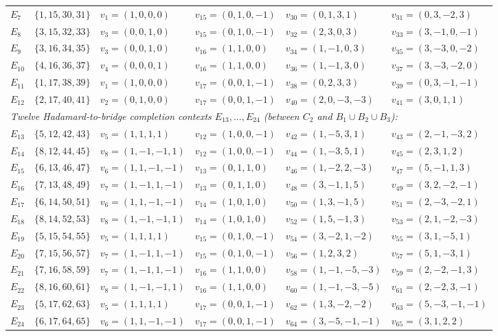 \documentclass[
  aps,
  pra,
  reprint,
  superscriptaddress,
  amsmath,
  amssymb,
  nofootinbib,
  floatfix
]{revtex4-2}
\theoremstyle{definition}
\theoremstyle{remark}
\begin{document}
\begin{table}[t]
\begin{ruledtabular}
\begin{tabular}{llllll}
$E_7$  & $\{1,15,30,31\}$ & $v_1=(1,0,0,0)$ & $v_{15}=(0,1,0,-1)$ & $v_{30}=(0,1,3,1)$   & $v_{31}=(0,3,-2,3)$ \\
$E_8$  & $\{3,15,32,33\}$ & $v_3=(0,0,1,0)$ & $v_{15}=(0,1,0,-1)$ & $v_{32}=(2,3,0,3)$   & $v_{33}=(3,-1,0,-1)$ \\
$E_9$  & $\{3,16,34,35\}$ & $v_3=(0,0,1,0)$ & $v_{16}=(1,1,0,0)$  & $v_{34}=(1,-1,0,3)$  & $v_{35}=(3,-3,0,-2)$ \\
$E_{10}$ & $\{4,16,36,37\}$ & $v_4=(0,0,0,1)$ & $v_{16}=(1,1,0,0)$  & $v_{36}=(1,-1,3,0)$  & $v_{37}=(3,-3,-2,0)$ \\
$E_{11}$ & $\{1,17,38,39\}$ & $v_1=(1,0,0,0)$ & $v_{17}=(0,0,1,-1)$ & $v_{38}=(0,2,3,3)$   & $v_{39}=(0,3,-1,-1)$ \\
$E_{12}$ & $\{2,17,40,41\}$ & $v_2=(0,1,0,0)$ & $v_{17}=(0,0,1,-1)$ & $v_{40}=(2,0,-3,-3)$ & $v_{41}=(3,0,1,1)$ \\ \hline
\multicolumn{6}{l}{\emph{Twelve Hadamard-to-bridge completion contexts $E_{13},\ldots,E_{24}$ (between $C_2$ and $B_1\cup B_2\cup B_3$):}} \\
$E_{13}$ & $\{5,12,42,43\}$ & $v_5=(1,1,1,1)$    & $v_{12}=(1,0,0,-1)$ & $v_{42}=(1,-5,3,1)$   & $v_{43}=(2,-1,-3,2)$ \\
$E_{14}$ & $\{8,12,44,45\}$ & $v_8=(1,-1,-1,1)$  & $v_{12}=(1,0,0,-1)$ & $v_{44}=(1,-3,5,1)$   & $v_{45}=(2,3,1,2)$ \\
$E_{15}$ & $\{6,13,46,47\}$ & $v_6=(1,1,-1,-1)$  & $v_{13}=(0,1,1,0)$  & $v_{46}=(1,-2,2,-3)$  & $v_{47}=(5,-1,1,3)$ \\
$E_{16}$ & $\{7,13,48,49\}$ & $v_7=(1,-1,1,-1)$  & $v_{13}=(0,1,1,0)$  & $v_{48}=(3,-1,1,5)$   & $v_{49}=(3,2,-2,-1)$ \\
$E_{17}$ & $\{6,14,50,51\}$ & $v_6=(1,1,-1,-1)$  & $v_{14}=(1,0,1,0)$  & $v_{50}=(1,3,-1,5)$   & $v_{51}=(2,-3,-2,1)$ \\
$E_{18}$ & $\{8,14,52,53\}$ & $v_8=(1,-1,-1,1)$  & $v_{14}=(1,0,1,0)$  & $v_{52}=(1,5,-1,3)$   & $v_{53}=(2,1,-2,-3)$ \\
$E_{19}$ & $\{5,15,54,55\}$ & $v_5=(1,1,1,1)$    & $v_{15}=(0,1,0,-1)$ & $v_{54}=(3,-2,1,-2)$  & $v_{55}=(3,1,-5,1)$ \\
$E_{20}$ & $\{7,15,56,57\}$ & $v_7=(1,-1,1,-1)$  & $v_{15}=(0,1,0,-1)$ & $v_{56}=(1,2,3,2)$    & $v_{57}=(5,1,-3,1)$ \\
$E_{21}$ & $\{7,16,58,59\}$ & $v_7=(1,-1,1,-1)$  & $v_{16}=(1,1,0,0)$  & $v_{58}=(1,-1,-5,-3)$ & $v_{59}=(2,-2,-1,3)$ \\
$E_{22}$ & $\{8,16,60,61\}$ & $v_8=(1,-1,-1,1)$  & $v_{16}=(1,1,0,0)$  & $v_{60}=(1,-1,-3,-5)$ & $v_{61}=(2,-2,3,-1)$ \\
$E_{23}$ & $\{5,17,62,63\}$ & $v_5=(1,1,1,1)$    & $v_{17}=(0,0,1,-1)$ & $v_{62}=(1,3,-2,-2)$  & $v_{63}=(5,-3,-1,-1)$ \\
$E_{24}$ & $\{6,17,64,65\}$ & $v_6=(1,1,-1,-1)$  & $v_{17}=(0,0,1,-1)$ & $v_{64}=(3,-5,-1,-1)$ & $v_{65}=(3,1,2,2)$
\end{tabular}
\end{ruledtabular}
\end{table}
\end{document}

